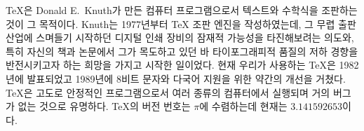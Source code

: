 \TeX 은 Donald E.~Knuth가 만든
컴퓨터 프로그램으로서 텍스트와 수학식을 조판하는 것이 그 목적이다\cite{texbook}. Knuth는 1977년부터 \TeX{} 조판 엔진을 
작성하였는데, 그 무렵 출판 산업에 스며들기 시작하던 디지털 인쇄 장비의
잠재적 가능성을 타진해보려는 의도와, 특히 자신의 책과 논문에서 그가 목도하고 있던 바 타이포그래피적 품질의
저하 경향을 반전시키고자 하는 희망을 가지고 시작한 일이었다.
현재 우리가 사용하는 \TeX 은 1982년에 발표되었고 1989년에 8비트 문자와 다국어 지원을 위한 약간의
개선을 거쳤다.
\TeX 은 고도로 안정적인 프로그램으로서 여러 종류의 컴퓨터에서 실행되며 거의 버그가 없는 것으로 유명하다.
\TeX 의 버전 번호는 $\pi$에 수렴하는데 현재는 $3.141592653$이다.

